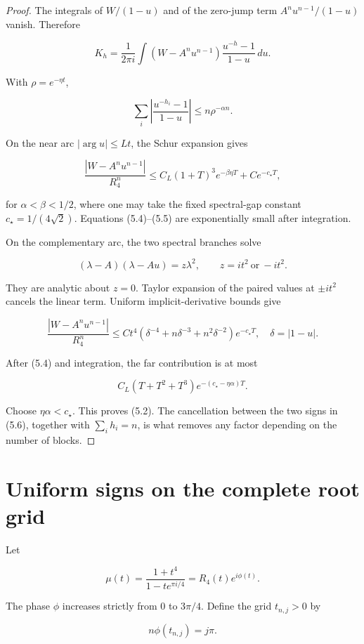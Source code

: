 \documentclass[11pt]{article}
\begin{document}
\begin{proof}


The integrals of $W/(1-u)$ and of the zero-jump term
$A^nu^{n-1}/(1-u)$ vanish.  Therefore

\[
K_h=\frac1{2\pi i}\int
(W-A^nu^{n-1})\frac{u^{-h}-1}{1-u}\,du. \tag{5.3}
\]

With $\rho=e^{-\eta t}$,

\[
\sum_i\left|\frac{u^{-h_i}-1}{1-u}\right|
\le n\rho^{-\alpha n}. \tag{5.4}
\]

On the near arc $|\arg u|\le Lt$, the Schur expansion gives

\[
\frac{|W-A^nu^{n-1}|}{R_4^n}
\le C_L(1+T)^3e^{-\beta\eta T}+Ce^{-c_\star T}, \tag{5.5}
\]

for $\alpha<\beta<1/2$, where one may take the fixed spectral-gap constant
$c_\star=1/(4\sqrt2)$.  Equations (5.4)--(5.5) are exponentially small after
integration.

On the complementary arc, the two spectral branches solve

\[
(\lambda-A)(\lambda-Au)=z\lambda^2,
\qquad z=it^2\ \text{or}\ -it^2. \tag{5.6}
\]

They are analytic about $z=0$.  Taylor expansion of the paired values at
$\pm it^2$ cancels the linear term.  Uniform implicit-derivative bounds give

\[
\frac{|W-A^nu^{n-1}|}{R_4^n}
\le Ct^4(\delta^{-4}+n\delta^{-3}+n^2\delta^{-2})e^{-c_\star T},
\quad \delta=|1-u|. \tag{5.7}
\]

After (5.4) and integration, the far contribution is at most

\[
C_L(T+T^2+T^3)e^{-(c_\star-\eta\alpha)T}.
\]

Choose $\eta\alpha<c_\star$.  This proves (5.2).  The cancellation between the
two signs in (5.6), together with $\sum_i h_i=n$, is what removes any factor
depending on the number of blocks.
\end{proof}


\section{Uniform signs on the complete root grid}


Let

\[
\mu(t)=\frac{1+t^4}{1-te^{\pi i/4}}
=R_4(t)e^{i\phi(t)}.
\]

The phase $\phi$ increases strictly from $0$ to $3\pi/4$.  Define the
grid $t_{n,j}>0$ by

\[
n\phi(t_{n,j})=j\pi. \tag{6.1}
\]
\end{document}
